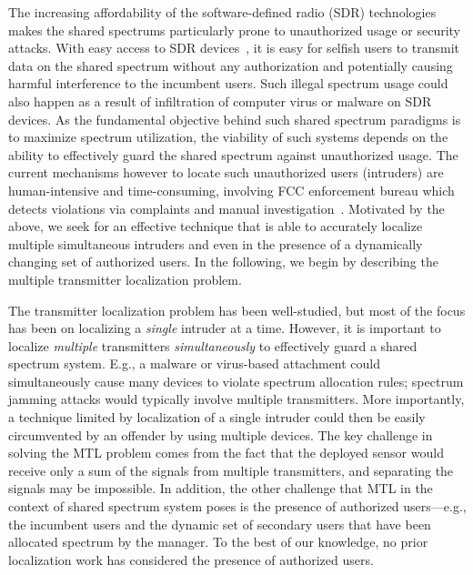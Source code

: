 The increasing affordability of the software-defined radio (SDR)
technologies makes the shared spectrums particularly prone to
unauthorized usage or security attacks. With easy access to SDR
devices~\cite{usrp,hackrf}, it is easy for selfish users to transmit data
on the shared spectrum without any authorization and potentially causing
harmful interference to the incumbent users.  Such illegal spectrum
usage could also happen as a result of infiltration of computer virus
or malware on SDR devices.  As the fundamental objective behind such
shared spectrum paradigms is to maximize spectrum utilization, the
viability of such systems depends on the ability to effectively guard
the shared spectrum against unauthorized usage.  The current
mechanisms however to locate such unauthorized users (intruders) are
human-intensive and time-consuming, involving FCC enforcement bureau
which detects violations via complaints and manual
investigation~\cite{mobicom17-splot}. 
Motivated by the above, we seek for an effective
technique that is able to accurately localize multiple simultaneous
intruders and even in the presence of a dynamically changing set of
authorized users. In the following, we begin by describing the multiple transmitter localization problem.


  
 The transmitter localization problem has been well-studied, but most of the focus has been on localizing a {\em single} intruder at a time. However, it is important to localize {\em multiple} transmitters {\em simultaneously} to effectively guard a shared spectrum
system. E.g., a malware or virus-based attachment could simultaneously cause many devices to violate spectrum allocation rules; spectrum
jamming attacks would typically involve multiple transmitters. More
importantly, a technique limited by localization of a single intruder
could then be easily circumvented by an offender by using multiple
devices.
The key challenge in solving the MTL problem comes from the fact that
the deployed sensor would receive only a sum of the signals from multiple transmitters, and separating the signals may be impossible.  In
addition, the other challenge that MTL in the context of shared
spectrum system poses is the presence of authorized users---e.g., the
incumbent users and the dynamic set of secondary users that have been
allocated spectrum by the manager. To the best of our knowledge, no prior
localization work has considered the presence of authorized users.

